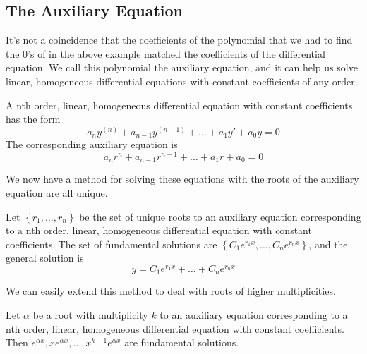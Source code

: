 \subsection{The Auxiliary Equation}
\noindent
It's not a coincidence that the coefficients of the polynomial that we had to find the 0's of in the above example matched the coefficients of the differential equation. We call this polynomial the auxiliary equation, and it can help us solve linear, homogeneous differential equations with constant coefficients of any order.
\begin{definition}
	A nth order, linear, homogeneous differential equation with constant coefficients has the form
	\begin{equation*}
		a_ny^{(n)} + a_{n-1}y^{(n-1)} + \ldots + a_1y' + a_0y = 0
	\end{equation*}
	The corresponding auxiliary equation is
	\begin{equation*}
		a_nr^n + a_{n-1}r^{n-1} + \ldots + a_1r + a_0 = 0
	\end{equation*}
\end{definition}

\noindent
We now have a method for solving these equations with the roots of the auxiliary equation are all unique. 
\begin{theorem}
	Let $\left\{r_1, \ldots, r_n\right\}$ be the set of unique roots to an auxiliary equation corresponding to a nth order, linear, homogeneous differential equation with constant coefficients. The set of fundamental solutions are $\left\{C_1e^{r_1x}, \ldots, C_ne^{r_nx}\right\}$, and the general solution is
	\begin{equation*}
		y = C_1e^{r_1x} + \ldots + C_ne^{r_nx}
	\end{equation*}
\end{theorem}

\noindent
We can easily extend this method to deal with roots of higher multiplicities.
\begin{theorem}
	Let $\alpha$ be a root with multiplicity $k$ to an auxiliary equation corresponding to a nth order, linear, homogeneous differential equation with constant coefficients. Then $e^{\alpha x}, xe^{\alpha x}, \ldots, x^{k-1}e^{\alpha x}$ are fundamental solutions.
\end{theorem}

